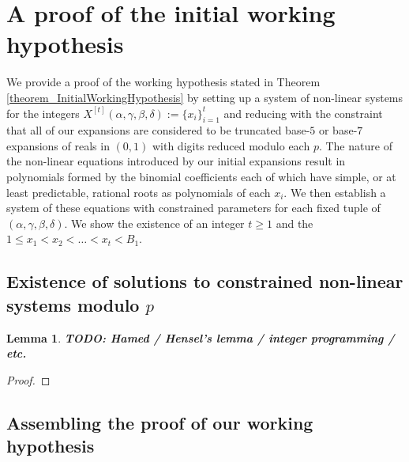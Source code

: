 \documentclass[12pt]{article}
\newtheorem{lemma}[theorem]{Lemma}
\begin{document}
\section{A proof of the initial working hypothesis}

We provide a proof of the working hypothesis stated in Theorem \ref{theorem_InitialWorkingHypothesis} 
by setting up a system of non-linear systems for the integers 
$X^{[t]}(\alpha,\gamma,\beta,\delta) := \{x_i\}_{i=1}^{t}$ and reducing with 
the constraint that all of our expansions are considered to be truncated base-$5$ or base-$7$ expansions of 
reals in $(0, 1)$ with digits reduced modulo each $p$. The nature of the non-linear equations introduced 
by our initial expansions result in polynomials formed by the binomial coefficients each of which have 
simple, or at least predictable, rational roots as polynomials of each $x_i$. 
We then establish a system of these equations with constrained parameters for each fixed tuple of 
$(\alpha,\gamma,\beta,\delta)$. We show the existence of an integer $t \geq 1$ and the 
$1 \leq x_1 < x_2 < \ldots < x_t < B_1$. 

\subsection{Existence of solutions to constrained non-linear systems modulo $p$} 

\begin{lemma} 
\label{lemma_ExistenceOfSolutionsLemma} 
\textbf{TODO: Hamed / Hensel's lemma / integer programming / etc.}
\end{lemma}
\begin{proof} 
\end{proof} 

\subsection{Assembling the proof of our working hypothesis} 
\end{document}
